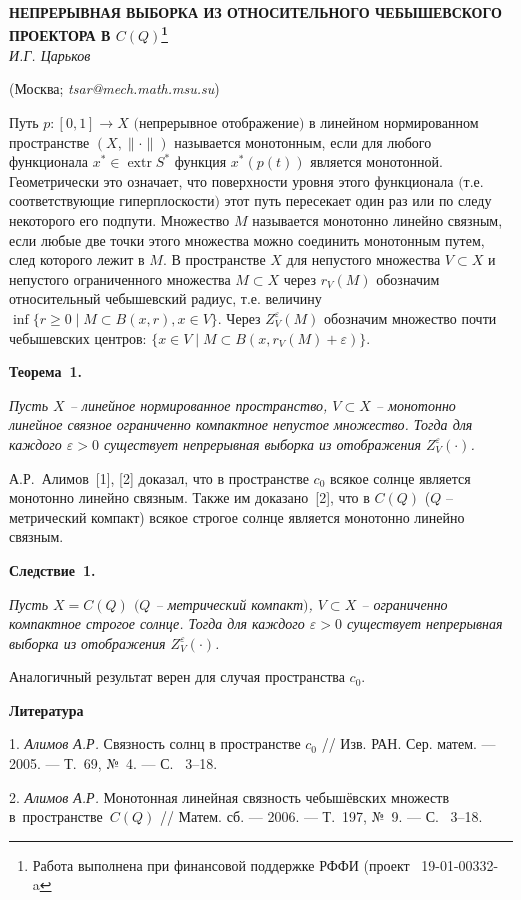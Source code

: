 \begin{center}
    {\bf НЕПРЕРЫВНАЯ ВЫБОРКА ИЗ ОТНОСИТЕЛЬНОГО ЧЕБЫШЕВСКОГО ПРОЕКТОРА В $C(Q)$\footnote{Работа выполнена при финансовой
поддержке РФФИ (проект \No\ 19-01-00332-a}}\\

    {\it И.Г. Царьков}

    (Москва; {\it tsar@mech.math.msu.su})
\end{center}



 Путь $p:[0,1]\rightarrow X$ $($непрерывное
отображение$)$ в линейном нормированном пространстве
$(X,\|\cdot\|)$ называется монотонным, если для любого функционала
$x^*\in\operatorname{extr}S^*$ функция $x^*(p(t))$ является
монотонной. Геометрически это означает, что поверхности уровня этого функционала $($т.е.
соответствующие гиперплоскости$)$ этот путь пересекает один раз или
по следу некоторого его подпути.
Множество $M$ называется монотонно линейно  связным, если любые
две точки этого множества можно соединить монотонным путем, след
которого лежит в $M.$
В пространстве $X$ для непустого множества $V\subset X$ и непустого ограниченного множества $M\subset X$ через $r_V(M)$ обозначим относительный чебышевский радиус, т.е. величину $\inf\{r\geqslant 0\mid M\subset B(x,r), x\in V\}$. Через
 $Z_V^\varepsilon (M)$ обозначим множество почти чебышевских центров: $ \{x\in V\mid M\subset B(x,r_V(M)+\varepsilon)\}$.


\textbf{Теорема~1.} {\it    Пусть $X$ -- линейное нормированное пространство, $V\subset X$ -- монотонно линейное связное ограниченно компактное непустое множество. Тогда для каждого $\varepsilon>0$ существует непрерывная выборка из отображения $Z_V^\varepsilon(\cdot)$.


}


А.Р.~Алимов~[1], [2] доказал, что в пространстве   $c_0$ всякое солнце является монотонно линейно связным. Также им доказано~[2], что в $C(Q)$ ($Q$ -- метрический компакт) всякое строгое солнце является монотонно линейно связным.




\textbf{Следствие~1.} {\it   Пусть   $X=C(Q) $ $(Q$ -- метрический компакт$)$, $V\subset X$ --   ограниченно компактное строгое солнце. Тогда для каждого $\varepsilon>0$ существует непрерывная выборка из отображения $Z_V^\varepsilon(\cdot)$.

}

Аналогичный результат верен  для случая пространства $c_0$.

\smallskip \centerline {\bf Литература} \nopagebreak


1. {\it Алимов А.Р.} Связность солнц в пространстве $c_0$ //  Изв. РАН. Сер. матем.
 ---  2005. ---
 Т.~69,
 №~4. --- С.~ 3--18.

2. {\it Алимов А.Р.} Монотонная линейная связность
чебышёвских множеств в~пространстве~$C(Q)$ //  Матем. сб.
 ---  2006. ---
 Т.~197,
 №~9. --- С.~ 3--18.

